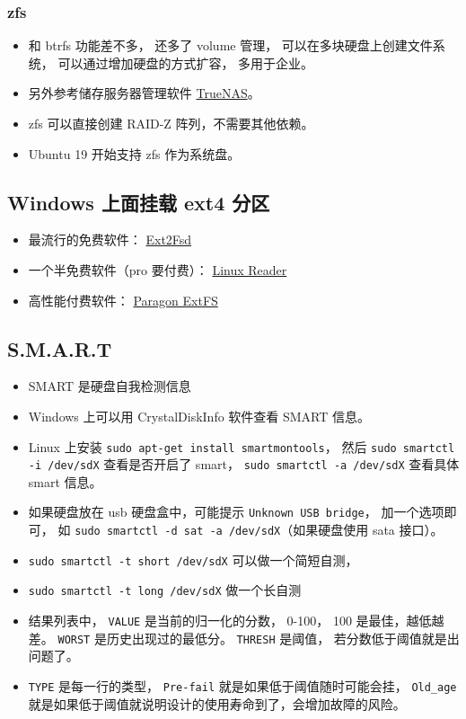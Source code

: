\subsubsection{zfs}
\begin{itemize}
\item 和 btrfs 功能差不多， 还多了 volume 管理， 可以在多块硬盘上创建文件系统， 可以通过增加硬盘的方式扩容， 多用于企业。
\item 另外参考储存服务器管理软件 \href{https://www.truenas.com/truenas-core/}{TrueNAS}。
\item zfs 可以直接创建 RAID-Z 阵列，不需要其他依赖。
\item Ubuntu 19 开始支持 zfs 作为系统盘。
\end{itemize}


\subsection{Windows 上面挂载 ext4 分区}
\begin{itemize}
\item 最流行的免费软件： \href{https://sourceforge.net/projects/ext2fsd/}{Ext2Fsd}
\item 一个半免费软件（pro 要付费）： \href{https://www.diskinternals.com/linux-reader/}{Linux Reader}
\item 高性能付费软件： \href{https://www.paragon-software.com/business/extfs-for-windows/}{Paragon ExtFS}
\end{itemize}

\subsection{S.M.A.R.T}
\begin{itemize}
\item SMART 是硬盘自我检测信息
\item Windows 上可以用 CrystalDiskInfo 软件查看 SMART 信息。
\item Linux 上安装 \verb`sudo apt-get install smartmontools`， 然后 \verb`sudo smartctl -i /dev/sdX` 查看是否开启了 smart， \verb`sudo smartctl -a /dev/sdX` 查看具体 smart 信息。
\item 如果硬盘放在 usb 硬盘盒中，可能提示 \verb`Unknown USB bridge`， 加一个选项即可， 如 \verb`sudo smartctl -d sat -a /dev/sdX`（如果硬盘使用 sata 接口）。
\item \verb`sudo smartctl -t short /dev/sdX` 可以做一个简短自测，
\item \verb`sudo smartctl -t long /dev/sdX` 做一个长自测
\item 结果列表中， \verb`VALUE` 是当前的归一化的分数， 0-100， 100 是最佳，越低越差。 \verb`WORST` 是历史出现过的最低分。 \verb`THRESH` 是阈值， 若分数低于阈值就是出问题了。
\item \verb`TYPE` 是每一行的类型， \verb`Pre-fail` 就是如果低于阈值随时可能会挂， \verb`Old_age` 就是如果低于阈值就说明设计的使用寿命到了，会增加故障的风险。
\end{itemize}


